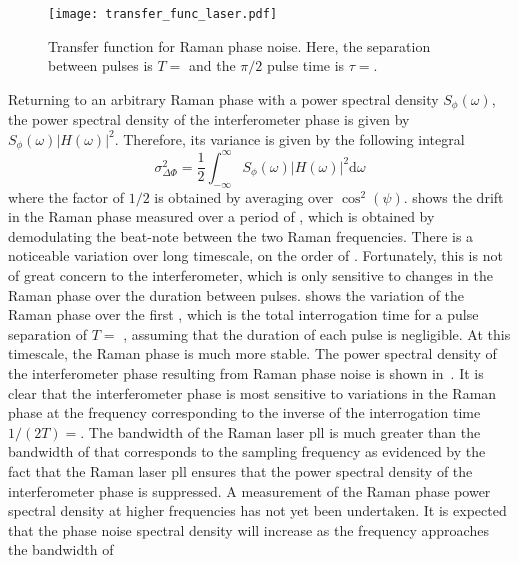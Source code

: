 \begin{figure}[htpb!]
  \centering
  \texttt{[image: transfer\_func\_laser.pdf]}
  \caption[Transfer function for Raman phase noise.]{Transfer function
  for Raman phase noise. Here, the separation between pulses is \(T =
  \) and the \(\pi/2\) pulse time is \(\tau
=\).}
  \label{fig:transfer_function}
\end{figure}
\par\noindent
Returning to an arbitrary Raman phase with a power spectral density
$S_\phi(\omega)$, the power spectral density of the interferometer
phase is given by $S_\phi(\omega) |H(\omega)|^2$. Therefore, its
variance is given by the following integral
\begin{equation}
  \sigma_{\Delta\Phi}^2 = \frac{1}{2}\int_{-\infty}^\infty
    S_\phi(\omega)|H(\omega)|^2 \mathrm{d}\omega 
  \end{equation}
where the factor of $1/2$ is obtained by averaging over
$\cos^2(\psi)$.
 shows the drift in the Raman phase
measured over a period of , which is obtained by
demodulating the beat-note between the two Raman frequencies. There is a noticeable
variation over long timescale, on the order of .
Fortunately, this is not of great concern to the interferometer, which is only sensitive to changes in the Raman phase
over the duration between pulses.  shows the
variation of the Raman phase over the first , which
is the total interrogation time for a pulse separation of $T = $
, assuming that the duration of each pulse is
negligible. At this timescale, the Raman phase
is much more stable. The power spectral density of the interferometer
phase resulting from Raman phase noise is shown
in~. It is clear that the interferometer
phase is most sensitive to variations in the Raman phase at the
frequency corresponding to the inverse of the interrogation time
$1/(2T) = $. The bandwidth of the Raman laser
\ac{pll} is much greater than the 
bandwidth of  that corresponds to the
 sampling frequency as evidenced by the fact that
the Raman laser \ac{pll} ensures that
the power spectral density of the interferometer phase is suppressed.
A measurement of the Raman phase power spectral density at higher frequencies has
not yet been undertaken. It is expected that the phase noise spectral
density will increase as the frequency approaches the bandwidth of
